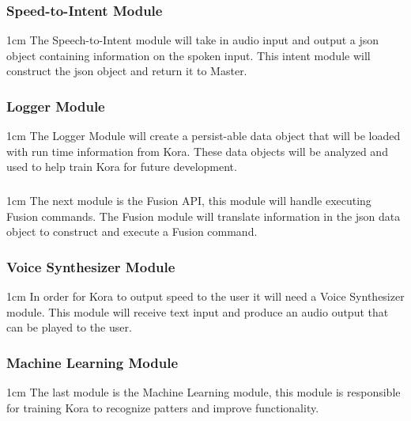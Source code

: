 \documentclass[onecolumn, draftclsnofoot,10pt, compsoc]{IEEEtran}
\def \botname{Kora\xspace}
\newenvironment{indentItem}[1][1cm]{\begin{adjustwidth}{#1}{}}{\end{adjustwidth}}
\begin{document}
		\subsubsection{Speed-to-Intent Module}
			\begin{indentItem}
				The Speech-to-Intent module will take in audio input and output a json object containing information on the spoken input.
				This intent module will construct the json object and return it to Master.
			\end{indentItem}
		\subsubsection{Logger Module}
			\begin{indentItem}
				The Logger Module will create a persist-able data object that will be loaded with run time information from \botname.
				These data objects will be analyzed and used to help train \botname for future development.
			\end{indentItem}
		\subsubsection{}
			\begin{indentItem}
				The next module is the Fusion API, this module will handle executing Fusion commands.
				The Fusion module will translate information in the json data object to construct and execute a Fusion command.
			\end{indentItem}
		\subsubsection{Voice Synthesizer Module}
			\begin{indentItem}
				In order for \botname to output speed to the user it will need a Voice Synthesizer module.
				This module will receive text input and produce an audio output that can be played to the user.
			\end{indentItem}		
		\subsubsection{Machine Learning Module}
			\begin{indentItem}
				The last module is the Machine Learning module, this module is responsible for training \botname to recognize patters and improve functionality.
			\end{indentItem}
		
\end{document}
